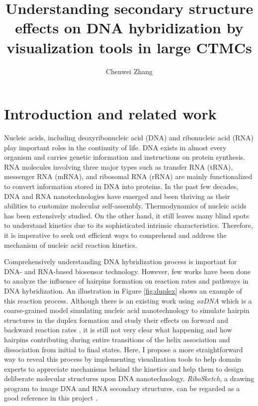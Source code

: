 \documentclass{article}
\begin{document}
	\title{Understanding secondary structure effects on DNA hybridization by visualization tools in large CTMCs \vspace{-0.7em}}
	\author{Chenwei Zhang}
	\date{}
	\maketitle
	\vspace{-3em}



\section{Introduction and related work}

Nucleic acids, including deoxyribonucleic acid (DNA) and ribonucleic acid (RNA) play important roles in the continuity of life. DNA exists in almost every organism and carries genetic information and instructions on protein synthesis. RNA molecules involving three major types such as transfer RNA (tRNA), messenger RNA (mRNA), and ribosomal RNA (rRNA) are mainly functionalized to convert information stored in DNA into proteins. In the past few decades, DNA and RNA nanotechnologies have emerged and been thriving as their abilities to customize molecular self-assembly. Thermodynamics of nucleic acids has been extensively studied. On the other hand, it still leaves many blind spots to understand kinetics due to its sophisticated intrinsic characteristics. Therefore, it is imperative to seek out efficient ways to comprehend and address the mechanism of nucleic acid reaction kinetics. 


Comprehensively understanding DNA hybridization process is important for DNA- and RNA-based biosensor technology. However, few works have been done to analyze the influence of hairpins formation on reaction rates and pathways in DNA hybridization. An illustration in Figure \ref{fig:duplex} shows an example of this reaction process. Although there is an existing work using \textit{oxDNA} which is a coarse-grained model simulating nucleic acid nanotechnology \cite{oxDNA} to simulate hairpin structures in the duplex formation and study their effects on forward and backward reaction rates \cite{schreck}, it is still not very clear what happening and how hairpins contributing during entire transitions of the helix association and dissociation from initial to final states. Here, I propose a more straightforward way to reveal this process by implementing visualization tools to help domain experts to appreciate mechanisms behind the kinetics and help them to design deliberate molecular structures upon DNA nanotechnology. \textit{RiboSketch}, a drawing program to image DNA and RNA secondary structures, can be regarded as a good reference in this project \cite{ribosketch}.
\end{document}
